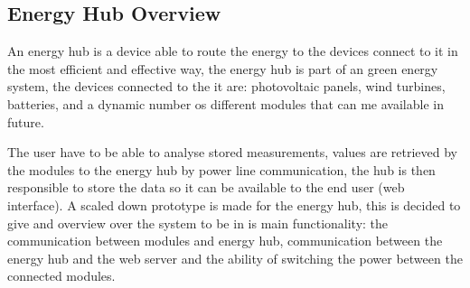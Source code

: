 \subsection{Energy Hub Overview}
An energy hub is a device able to route the energy to the devices connect to it in the most efficient and effective way, the energy hub is part of an green energy system, the devices connected to the it are: photovoltaic panels, wind turbines, batteries, and a dynamic number os different modules that can me available in future. 

The user have to be able to analyse stored measurements, values are retrieved by the modules to the energy hub by power line communication, the hub is then responsible to store the data so it can be available to the end user (web interface). A scaled down prototype is made for the energy hub, this is decided to give and overview over the system to be in is main functionality: the communication between modules and energy hub, communication between the energy hub and the web server and the ability of switching the power between the connected modules.